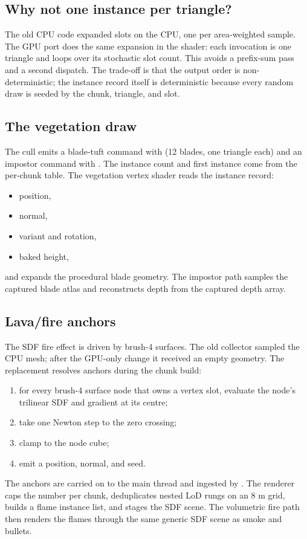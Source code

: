 \subsection{Why not one instance per triangle?}

The old CPU code expanded slots on the CPU, one per area-weighted sample.
The GPU port does the same expansion in the shader: each invocation is one
triangle and loops over its stochastic slot count.  This avoids a
prefix-sum pass and a second dispatch.  The trade-off is that the output
order is non-deterministic; the instance record itself is deterministic
because every random draw is seeded by the chunk, triangle, and slot.

\subsection{The vegetation draw}

The cull emits a blade-tuft command with
 (12 blades, one triangle each) and an impostor command
with .  The instance count and first instance come from
the per-chunk table.  The vegetation vertex shader reads the instance
record:
\begin{itemize}
\item position,
\item normal,
\item variant and rotation,
\item baked height,
\end{itemize}
and expands the procedural blade geometry.  The impostor path samples the
captured blade atlas and reconstructs depth from the captured depth array.

\subsection{Lava/fire anchors}

The SDF fire effect is driven by brush-4 surfaces.  The old collector
sampled the CPU mesh; after the GPU-only change it received an empty
geometry.  The replacement resolves anchors during the chunk build:
\begin{enumerate}
\item for every brush-4 surface node that owns a vertex slot, evaluate the
  node's trilinear SDF and gradient at its centre;
\item take one Newton step to the zero crossing;
\item clamp to the node cube;
\item emit a position, normal, and seed.
\end{enumerate}
The anchors are carried on  to the main thread and ingested
by .  The renderer caps the number per chunk, deduplicates
nested LoD rungs on an 8 m grid, builds a flame instance list, and stages
the SDF scene.  The volumetric fire path then renders the flames through
the same generic SDF scene as smoke and bullets.

